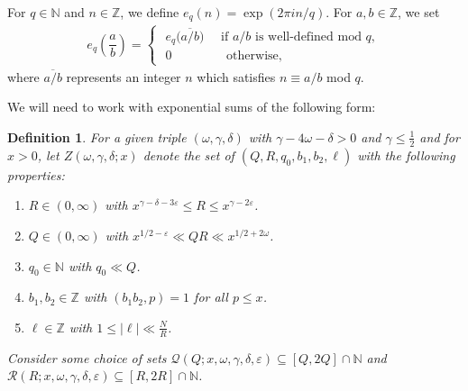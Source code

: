 \documentclass{amsart}
\newtheorem{defn}{Definition}
\numberwithin{equation}{section}
\begin{document}
 
\medskip 
 For $q \in \mathbb{N}$ and $n \in \mathbb{Z}$, we define $e_q(n) = \exp(2\pi i n/q)$. For $a, b \in \mathbb{Z}$, we set 
\begin{align*}
e_q\left(\dfrac{a}{b}\right) = \begin{cases} \,\,
e_q\big( \overline{a/b} \big) \quad \mbox{ if } a/b  \mbox{ is well-defined mod } q, \\ \,\, 0 \qquad\qquad\! \mbox{ otherwise,}
\end{cases}
\end{align*}
where $\overline{a/b}$ represents an integer $n$ which satisfies $n \equiv a/b$ mod $q$.

\medskip
We will need to work with exponential sums of the following form:
\begin{defn}\label{def:sigTheorem58}
For a given triple  $(\omega,\gamma,\delta)$ with  $
\gamma-4\omega  -\delta  >0$ and $\gamma \leq \frac{1}{2}$ and for $x>0$, let $Z(\omega,\gamma,\delta;x)$ denote the set of $(Q,R,q_0,b_1,b_2,\ell)$ with the following properties:
\begin{enumerate}[{\rm(i)}]
\item  $R \in (0,\infty)$ with $x^{\gamma-\delta -3\varepsilon} \leq R \leq x^{\gamma - 2\varepsilon} $.
\item $Q \in (0,\infty)$ with $x^{1/2-\varepsilon} \ll QR \ll x^{1/2+2\omega}$.
\item $q_0 \in \mathbb{N}$ with  $q_0 \ll Q$.
\item $b_1, b_2 \in \mathbb{Z}$ with $(b_1b_2,p)=1$ for all $p \leq x$.
\item $\ell \in \mathbb{Z}$ with  $1 \leq |\ell| \ll \frac{N}{R}$.
\end{enumerate}
  
Consider some choice of sets $\mathcal{Q}(Q;x,\omega,\gamma,\delta,\varepsilon) \subseteq [Q,2Q] \cap \mathbb{N}$ and $\mathcal{R}(R;x,\omega,\gamma,\delta,\varepsilon) \subseteq [R,2R] \cap \mathbb{N}$.


\end{defn}
\end{document}
